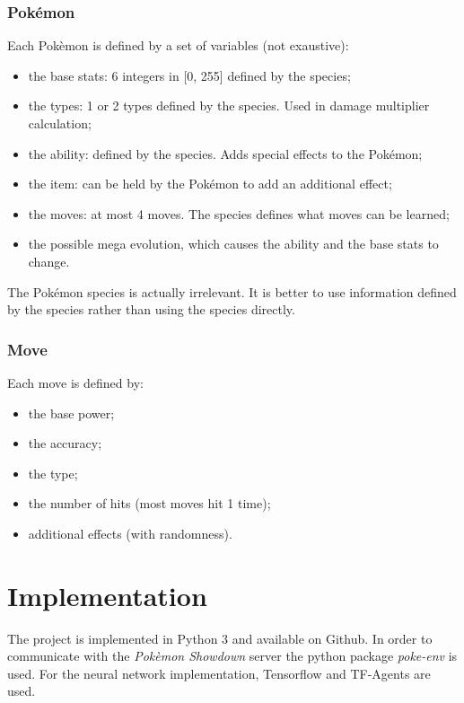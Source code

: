 \documentclass{article}
\begin{document}
\subsubsection{Pokémon}

Each Pokèmon is defined by a set of variables (not exaustive):
\begin{itemize}
    \item the base stats: 6 integers in [0, 255] defined by the species;
    \item the types: 1 or 2 types defined by the species. Used in damage multiplier calculation;
    \item the ability: defined by the species. Adds special effects to the Pokémon;
    \item the item: can be held by the Pokémon to add an additional effect;
    \item the moves: at most 4 moves. The species defines what moves can be learned;
    \item the possible mega evolution, which causes the ability and the base stats to change.
\end{itemize}
The Pokémon species is actually irrelevant.
It is better to use information defined by the species rather than using the species directly.

\subsubsection{Move}

Each move is defined by:
\begin{itemize}
    \item the base power;
    \item the accuracy;
    \item the type;
    \item the number of hits (most moves hit 1 time);
    \item additional effects (with randomness).
\end{itemize}

\section{Implementation}

The project is implemented in Python 3 and available on Github\cite{repo}.
In order to communicate with the \textit{Pokèmon Showdown} server\cite{smogon} the python package \textit{poke-env}\cite{pokeenv} is used.
For the neural network implementation, Tensorflow\cite{tensorflow} and TF-Agents\cite{TFAgents} are used.
\end{document}
